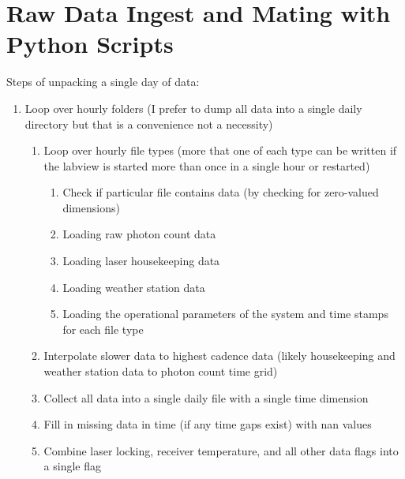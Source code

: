
\section{Raw Data Ingest and Mating with Python Scripts}


Steps of unpacking a single day of data:
\begin{enumerate}
	\item{Loop over hourly folders (I prefer to dump all data into a single daily directory but that is a convenience not a necessity)}
	\begin{enumerate}
		\item{Loop over hourly file types (more that one of each type can be written if the labview is started more than once in a single hour or restarted)}
			\begin{enumerate}
				\item{Check if particular file contains data (by checking for zero-valued dimensions)}
				\item{Loading raw photon count data}
				\item{Loading laser housekeeping data}
				\item{Loading weather station data}
				\item{Loading the operational parameters of the system and time stamps for each file type}
			\end{enumerate}
		\item{Interpolate slower data to highest cadence data (likely housekeeping and weather station data to photon count time grid)}
		\item{Collect all data into a single daily file with a single time dimension}
		\item{Fill in missing data in time (if any time gaps exist) with nan values}
		\item{Combine laser locking, receiver temperature, and all other data flags into a single flag}
	\end{enumerate}
\end{enumerate}


\newpage

